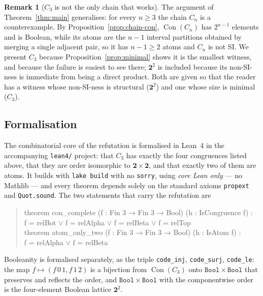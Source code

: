 \documentclass[11pt]{article}
\theoremstyle{definition}
\newtheorem{remark}[theorem]{Remark}
\newcommand{\Con}{\operatorname{Con}}
\begin{document}
\begin{remark}[$C_3$ is not the only chain that works]\label{rem:chains}
The argument of Theorem~\ref{thm:main} generalises: for every $n \ge 3$ the
chain $C_n$ is a counterexample. By Proposition~\ref{prop:chain-con},
$\Con(C_n)$ has $2^{n-1}$ elements and is Boolean, while its atoms are the
$n-1$ interval partitions obtained by merging a single adjacent pair, so it
has $n-1 \ge 2$ atoms and $C_n$ is not SI. We present $C_3$ because
Proposition~\ref{prop:minimal} shows it is the smallest witness, and because
the failure is easiest to see there; $\mathbf{2}^2$ is included because its
non-SI-ness is immediate from being a direct product. Both are given so that
the reader has a witness whose non-SI-ness is structural ($\mathbf{2}^2$) and
one whose size is minimal ($C_3$).
\end{remark}

\subsection*{Formalisation}

The combinatorial core of the refutation is formalised in Lean~4 in the
accompanying \texttt{lean4/} project: that $C_3$ has exactly the four
congruences listed above, that they are order isomorphic to
$\mathbf{2} \times \mathbf{2}$, and that exactly two of them are atoms. It
builds with \texttt{lake build} with no \texttt{sorry}, using \emph{core Lean
only} --- no Mathlib --- and every theorem depends solely on the standard
axioms \texttt{propext} and \texttt{Quot.sound}. The two statements that carry
the refutation are

\begin{quote}\ttfamily
theorem con\_complete (f : Fin 3 → Fin 3 → Bool) (h : IsCongruence f) :\\
\hspace*{1.5em}f = relBot $\vee$ f = relAlpha $\vee$ f = relBeta $\vee$ f = relTop\\[0.5em]
theorem atom\_only\_two (f : Fin 3 → Fin 3 → Bool) (h : IsAtom f) :\\
\hspace*{1.5em}f = relAlpha $\vee$ f = relBeta
\end{quote}

\noindent Booleanity is formalised separately, as the triple
\texttt{code\_inj}, \texttt{code\_surj}, \texttt{code\_le}: the map
$f \mapsto (f\,0\,1, f\,1\,2)$ is a bijection from $\Con(C_3)$ onto
$\mathtt{Bool} \times \mathtt{Bool}$ that preserves and reflects the order, and
$\mathtt{Bool} \times \mathtt{Bool}$ with the componentwise order is the
four-element Boolean lattice $\mathbf{2}^2$.
\end{document}
